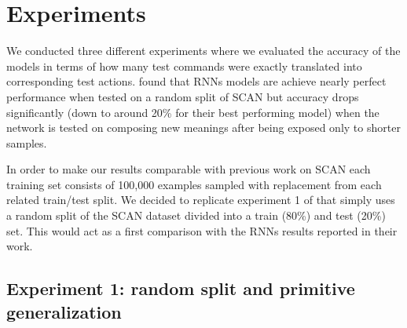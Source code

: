 \section{Experiments}
\label{sec:intro}

We conducted three different experiments where we evaluated the accuracy of the models in terms of how many test commands were exactly translated
into corresponding test actions. 
\citet{Lake:Baroni:2017} found that RNNs models are achieve nearly perfect performance when tested on a random split of SCAN but accuracy drops significantly
(down to around 20\% for their best performing model) when the network is tested on composing new meanings after being exposed only to shorter samples.

In order to make our results comparable with previous work on SCAN each training set consists of 100,000 examples sampled with replacement
from each related train/test split. We decided to replicate experiment 1 of \cite{Lake:Baroni:2017} that simply uses a random split
of the SCAN dataset divided into a train (80\%) and test (20\%) set. This would act as a first comparison with the RNNs results reported in their work.

\subsection{Experiment 1: random split and primitive generalization}
\label{subsec:exp1}

